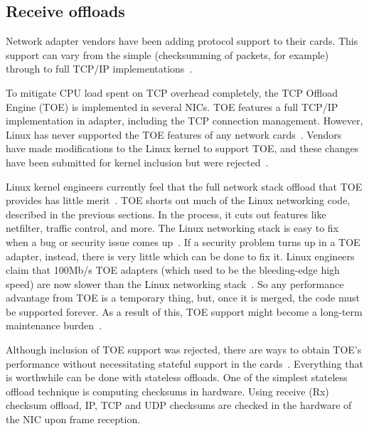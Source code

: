 
\subsection{Receive offloads}\label{subsec:linux-ingress-offloads}
Network adapter vendors have been adding protocol support to their cards.
This support can vary from the simple (checksumming of packets, for example)
through to full TCP/IP implementations~\cite{linux-and-tcp-offload-engines}.

To mitigate CPU load spent on TCP overhead completely, the TCP Offload Engine (TOE) is implemented in several NICs.
TOE features a full TCP/IP implementation in adapter, including the TCP connection management.
However, Linux has never supported the TOE features of any network cards~\cite{linux-and-tcp-offload-engines}.
Vendors have made modifications to the Linux kernel to support TOE,
and these changes have been submitted for kernel inclusion but were rejected~\cite{linux-foundation-toe}. 

Linux kernel engineers currently feel that the full network stack offload
that TOE provides has little merit~\cite{linux-foundation-toe}.
TOE shorts out much of the Linux networking code, described in the previous sections.
In the process, it cuts out features like netfilter, traffic control, and more.
The Linux networking stack is easy to fix when a bug or security issue comes up~\cite{linux-and-tcp-offload-engines}.
If a security problem turns up in a TOE adapter, instead, there is very little which can be done to fix it.
Linux engineers claim that 100Mb/s TOE adapters
(which used to be the bleeding-edge high speed)
are now slower than the Linux networking stack~\cite{linux-and-tcp-offload-engines}.
So any performance advantage from TOE is a temporary thing, but, once it is merged, the code must be supported forever.
As a result of this, TOE support might become a long-term maintenance burden~\cite{linux-and-tcp-offload-engines}.

Although inclusion of TOE support was rejected, there are ways to obtain TOE's performance without
necessitating stateful support in the cards~\cite{linux-and-tcp-offload-engines}.
Everything that is worthwhile can be done with stateless offloads.
One of the simplest stateless offload technique is computing checksums in hardware.
Using receive (Rx) checksum offload, IP, TCP and UDP checksums are checked in the hardware of the NIC upon frame reception.

